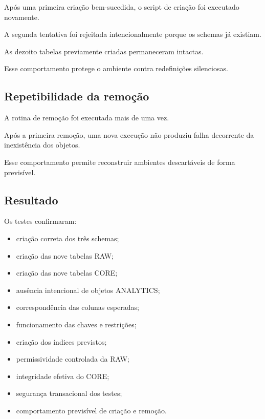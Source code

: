 \documentclass[12pt,a4paper]{article}
\begin{document}
{	Após uma primeira criação bem-sucedida, o script de criação foi
	executado novamente.
	
	A segunda tentativa foi rejeitada intencionalmente porque os schemas
	já existiam.
	
	As dezoito tabelas previamente criadas permaneceram intactas.
	
	Esse comportamento protege o ambiente contra redefinições silenciosas.
	
	\subsection{Repetibilidade da remoção}
	
	A rotina de remoção foi executada mais de uma vez.
	
	Após a primeira remoção, uma nova execução não produziu falha
	decorrente da inexistência dos objetos.
	
	Esse comportamento permite reconstruir ambientes descartáveis de
	forma previsível.
	
	\subsection{Resultado}
	
	Os testes confirmaram:
	
	\begin{itemize}[leftmargin=1.2cm]
		\item criação correta dos três schemas;
		\item criação das nove tabelas RAW;
		\item criação das nove tabelas CORE;
		\item ausência intencional de objetos ANALYTICS;
		\item correspondência das colunas esperadas;
		\item funcionamento das chaves e restrições;
		\item criação dos índices previstos;
		\item permissividade controlada da RAW;
		\item integridade efetiva do CORE;
		\item segurança transacional dos testes;
		\item comportamento previsível de criação e remoção.
	\end{itemize}
	
}
\end{document}
